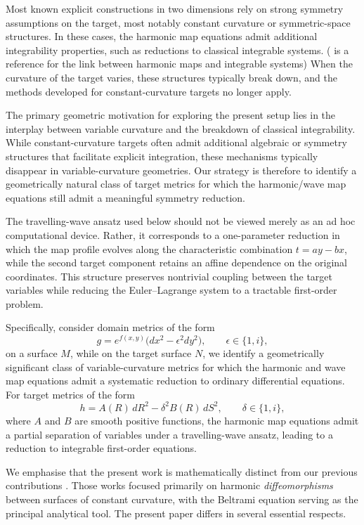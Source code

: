 \documentclass[12pt]{amsart}
\begin{document}
Most known explicit constructions in two dimensions rely on strong
symmetry assumptions on the target, most notably constant curvature
or symmetric-space structures. In these cases, the harmonic map
equations admit additional integrability properties, such as
reductions to classical integrable systems. (\cite{FordyWood} is a reference for the link between harmonic maps and integrable systems) When the curvature of the
target varies, these structures typically break down, and the methods
developed for constant-curvature targets no longer apply.

The primary geometric motivation for exploring the present setup lies
in the interplay between variable curvature and the breakdown of
classical integrability. While constant-curvature targets often admit
additional algebraic or symmetry structures that facilitate explicit
integration, these mechanisms typically disappear in variable-curvature
geometries. Our strategy is therefore to identify a geometrically
natural class of target metrics for which the harmonic/wave map
equations still admit a meaningful symmetry reduction.

The travelling-wave ansatz used below should not be viewed merely as an
ad hoc computational device. Rather, it corresponds to a one-parameter
reduction in which the map profile evolves along the characteristic
combination $t=ay-bx$, while the second target component retains an
affine dependence on the original coordinates. This structure preserves
nontrivial coupling between the target variables while reducing the
Euler--Lagrange system to a tractable first-order problem.

Specifically, consider domain metrics of the form
\[
g = e^{f(x,y)} \bigl( dx^{2} - \epsilon^{2} dy^{2} \bigr),
\qquad \epsilon \in \{1,i\},
\]
on a surface $M$, while on the target surface $N$, we identify a geometrically significant class of
variable-curvature metrics for which the harmonic and wave map
equations admit a systematic reduction to ordinary differential
equations. For target metrics of the form
\[
h = A(R)\,dR^{2} - \delta^{2} B(R)\,dS^{2},
\qquad \delta \in \{1,i\},
\]
where $A$ and $B$ are smooth positive functions, the harmonic map
equations admit a partial separation of variables under a
travelling-wave ansatz, leading to a reduction to integrable
first-order equations.


We emphasise that the present work is mathematically distinct from our
previous contributions
\cite{FotDask1,FotDask2,PPFD}. Those works focused primarily on
harmonic \emph{diffeomorphisms} between surfaces of constant curvature,
with the Beltrami equation serving as the principal analytical tool.
The present paper differs in several essential respects.
\end{document}
